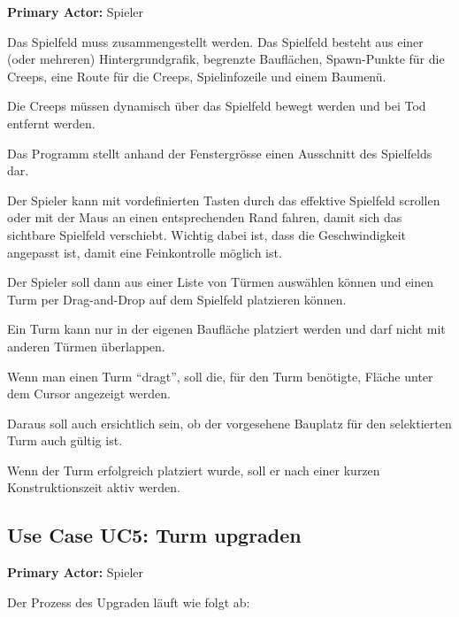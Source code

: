 \textbf{Primary Actor:} Spieler

Das Spielfeld muss zusammengestellt werden. Das Spielfeld besteht aus einer (oder mehreren) Hintergrundgrafik, 
begrenzte Bauflächen, Spawn-Punkte für die Creeps, eine Route für die Creeps, Spielinfozeile und einem Baumenü.

Die Creeps müssen dynamisch über das Spielfeld bewegt werden und bei Tod entfernt werden.

Das Programm stellt anhand der Fenstergrösse einen Ausschnitt des Spielfelds dar. 

Der Spieler kann mit vordefinierten Tasten durch das effektive Spielfeld scrollen oder mit der 
Maus an einen entsprechenden Rand fahren, damit sich das sichtbare Spielfeld verschiebt.
Wichtig dabei ist, dass die Geschwindigkeit angepasst ist, damit eine Feinkontrolle möglich ist.

Der Spieler soll dann aus einer Liste von Türmen auswählen können und einen Turm per Drag-and-Drop auf dem 
Spielfeld platzieren können.

Ein Turm kann nur in der eigenen Baufläche platziert werden und darf nicht mit anderen Türmen überlappen. 

Wenn man einen Turm ``dragt'', soll die, für den Turm benötigte, Fläche unter dem Cursor angezeigt werden.

Daraus soll auch ersichtlich sein, ob der vorgesehene Bauplatz für den selektierten Turm auch gültig ist.

Wenn der Turm erfolgreich platziert wurde, soll er nach einer kurzen Konstruktionszeit aktiv werden.






\subsection{Use Case UC5: Turm upgraden}

\textbf{Primary Actor:} Spieler

Der Prozess des Upgraden läuft wie folgt ab:

